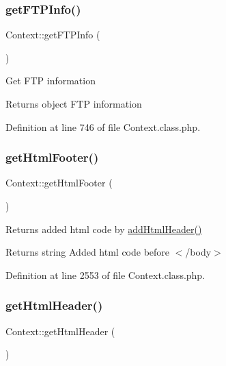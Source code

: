 \mbox{\label{classContext_a4f3473f93028ce5f422135106f125f31}} 
\subsubsection{\texorpdfstring{get\+F\+T\+P\+Info()}{getFTPInfo()}}
{\footnotesize\ttfamily Context\+::get\+F\+T\+P\+Info (\begin{DoxyParamCaption}{ }\end{DoxyParamCaption})}

Get F\+TP information

\begin{DoxyReturn}{Returns}
object F\+TP information 
\end{DoxyReturn}


Definition at line 746 of file Context.\+class.\+php.

\mbox{\label{classContext_ae7bb6879f84366eea76da3a7bf6a40bd}} 
\subsubsection{\texorpdfstring{get\+Html\+Footer()}{getHtmlFooter()}}
{\footnotesize\ttfamily Context\+::get\+Html\+Footer (\begin{DoxyParamCaption}{ }\end{DoxyParamCaption})}

Returns added html code by \hyperlink{classContext_a26a1aea944ae54bb826500f544a67950}{add\+Html\+Header()}

\begin{DoxyReturn}{Returns}
string Added html code before $<$/body$>$ 
\end{DoxyReturn}


Definition at line 2553 of file Context.\+class.\+php.

\mbox{\label{classContext_a302e4b5d868e7a5c8bee216f774ca244}} 
\subsubsection{\texorpdfstring{get\+Html\+Header()}{getHtmlHeader()}}
{\footnotesize\ttfamily Context\+::get\+Html\+Header (\begin{DoxyParamCaption}{ }\end{DoxyParamCaption})}

